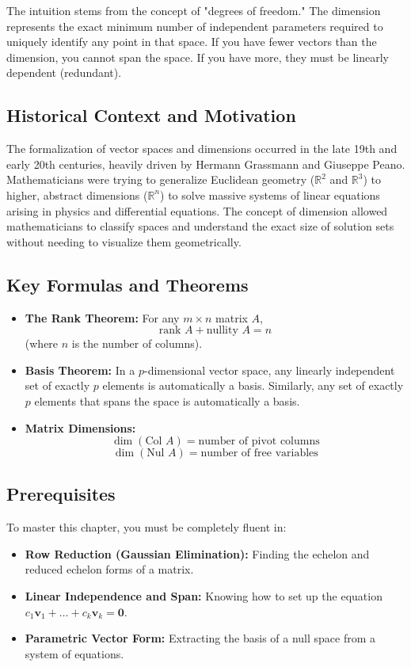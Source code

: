 \documentclass[12pt]{article}
\begin{document}
The intuition stems from the concept of "degrees of freedom." The dimension represents the exact minimum number of independent parameters required to uniquely identify any point in that space. If you have fewer vectors than the dimension, you cannot span the space. If you have more, they must be linearly dependent (redundant).

\subsection{Historical Context and Motivation}
The formalization of vector spaces and dimensions occurred in the late 19th and early 20th centuries, heavily driven by Hermann Grassmann and Giuseppe Peano. Mathematicians were trying to generalize Euclidean geometry ($\mathbb{R}^2$ and $\mathbb{R}^3$) to higher, abstract dimensions ($\mathbb{R}^n$) to solve massive systems of linear equations arising in physics and differential equations. The concept of dimension allowed mathematicians to classify spaces and understand the exact size of solution sets without needing to visualize them geometrically.

\subsection{Key Formulas and Theorems}
\begin{itemize}
    \item \textbf{The Rank Theorem:} For any $m \times n$ matrix $A$, 
    \[ \text{rank } A + \text{nullity } A = n \]
    (where $n$ is the number of columns).
    \item \textbf{Basis Theorem:} In a $p$-dimensional vector space, any linearly independent set of exactly $p$ elements is automatically a basis. Similarly, any set of exactly $p$ elements that spans the space is automatically a basis.
    \item \textbf{Matrix Dimensions:} 
    \[ \dim(\text{Col } A) = \text{number of pivot columns} \]
    \[ \dim(\text{Nul } A) = \text{number of free variables} \]
\end{itemize}

\subsection{Prerequisites}
To master this chapter, you must be completely fluent in:
\begin{itemize}
    \item \textbf{Row Reduction (Gaussian Elimination):} Finding the echelon and reduced echelon forms of a matrix.
    \item \textbf{Linear Independence and Span:} Knowing how to set up the equation $c_1\mathbf{v}_1 + \dots + c_k\mathbf{v}_k = \mathbf{0}$.
    \item \textbf{Parametric Vector Form:} Extracting the basis of a null space from a system of equations.
\end{itemize}
\end{document}
